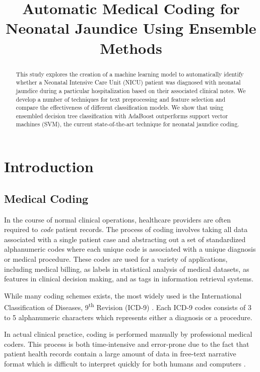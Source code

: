 \documentclass[conference]{IEEEtran}
\begin{document}
\title{Automatic Medical Coding for Neonatal Jaundice Using Ensemble Methods
}


\author{
}

\maketitle

\begin{abstract}
This study explores the creation of a machine learning model to automatically identify whether a Neonatal Intensive Care Unit (NICU) patient was diagnosed with neonatal jaundice during a particular hospitalization based on their associated clinical notes. We develop a number of techniques for text preprocessing and feature selection and compare the effectiveness of different classification models. We show that using ensembled decision tree classification with AdaBoost outperforms support vector machines (SVM), the current state-of-the-art technique for neonatal jaundice coding.
\end{abstract}

\section{Introduction}
\subsection{Medical Coding}\label{AA}
In the course of normal clinical operations, healthcare providers are often required to \textit{code} patient records. The process of coding involves taking all data associated with a single patient case and abstracting out a set of standardized alphanumeric codes where each unique code is associated with a unique diagnosis or medical procedure. These codes are used for a variety of applications, including medical billing, as labels in statistical analysis of medical datasets, as features in clinical decision making, and as tags in information retrieval systems. 

While many coding schemes exists, the most widely used is the International Classification of Diseases, 9\textsuperscript{th} Revision (ICD-9) \cite{Slee}. Each ICD-9 codes consists of 3 to 5 alphanumeric characters which represents either a diagnosis or a procedure.

In actual clinical practice, coding is performed manually by professional medical coders. This process is both time-intensive and error-prone due to the fact that patient health records contain a large amount of data in free-text narrative format which is difficult to interpret quickly for both humans and computers \cite{Tange}\cite{OMalley}. 
\end{document}
